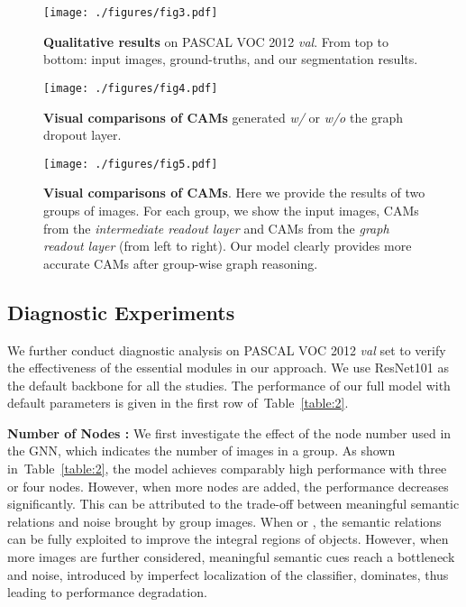\documentclass[letterpaper]{article} \usepackage{aaai21}  \usepackage{times}  \usepackage{helvet} \usepackage{courier}  \usepackage[hyphens]{url}  \usepackage{graphicx} \urlstyle{rm} \def\UrlFont{\rm}  \usepackage{graphicx}  \usepackage{natbib}  \usepackage{caption} \frenchspacing  \setlength{\pdfpagewidth}{8.5in}  \setlength{\pdfpageheight}{11in}
\newcommand{\tabref}[1]{Table~\ref{#1}}
\begin{document}
\begin{figure*}[!t]
	\centering
	\texttt{[image: ./figures/fig3.pdf]}
	\caption{\small\textbf{Qualitative results} on PASCAL VOC 2012 \textit{val}. From top to bottom: input images, ground-truths, and our segmentation results.}
	\label{figure:3}
\end{figure*}

\begin{figure}[!t]
	\centering
	\texttt{[image: ./figures/fig4.pdf]}
	\caption{\small\textbf{Visual comparisons of CAMs} generated \textit{w/} or \textit{w/o} the graph dropout layer.}
	\label{fig:4}
\end{figure}

\begin{figure}[!t]
	\centering
	\texttt{[image: ./figures/fig5.pdf]}
	
	\caption{\small \textbf{Visual comparisons of CAMs}. Here we provide the results of two groups of images. For each group, we show the input images, CAMs from the \textit{intermediate readout layer} and CAMs from the \textit{graph readout layer} (from left to right). Our model clearly provides more accurate CAMs after group-wise graph reasoning.}
	
\label{fig:5}
\end{figure}


\subsection{Diagnostic Experiments}
We further conduct diagnostic analysis on PASCAL VOC 2012 \textit{val} set to verify the effectiveness of the essential modules in our approach. We use ResNet101 as the default backbone for all the studies. The performance of our full model with default parameters is given in the first row of~\tabref{table:2}.




\noindent\textbf{Number of Nodes :} We first investigate the effect of the node number  used in the GNN, which indicates the number of images in a group. As shown in~\tabref{table:2}, the model achieves comparably high performance with three or four nodes. However, when more nodes are added, the performance decreases significantly. This can be attributed to the trade-off between meaningful semantic relations and noise brought by group images. When  or , the semantic relations can be fully exploited to improve the integral regions of objects. However, when more images are further considered, meaningful semantic cues reach a bottleneck and noise, introduced by imperfect localization of the classifier, dominates, thus leading to performance degradation.
\end{document}
